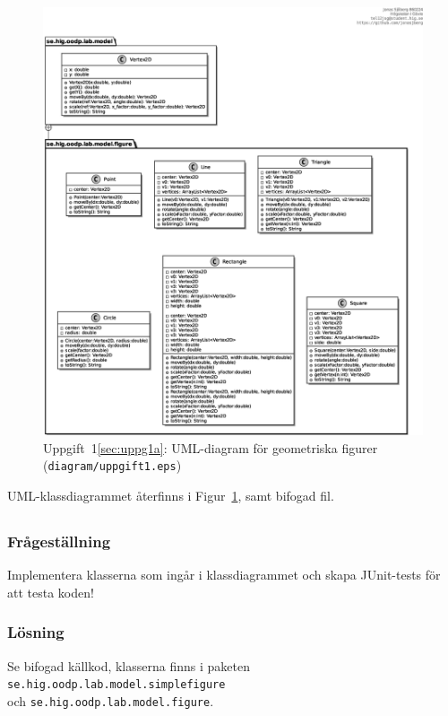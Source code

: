 \begin{figure}[htbp]
\centering
\includegraphics[width=\linewidth]{diagram/uppgift1.eps}
\caption{Uppgift~1\ref{sec:uppg1a}: UML-diagram för geometriska figurer
(\texttt{diagram/uppgift1.eps})}
\label{fig:uppg1a}
\end{figure}

\par UML-klassdiagrammet återfinns i Figur~\ref{fig:uppg1a}, samt bifogad fil.


\subsection{}\label{sec:uppg1b}
\subsubsection*{Frågeställning}
Implementera klasserna som ingår i klassdiagrammet och skapa JUnit-tests för
att testa koden!

\subsubsection*{Lösning}
Se bifogad källkod, klasserna finns i paketen
\texttt{se.hig.oodp.lab.model.simplefigure} \\ och
\texttt{se.hig.oodp.lab.model.figure}.



